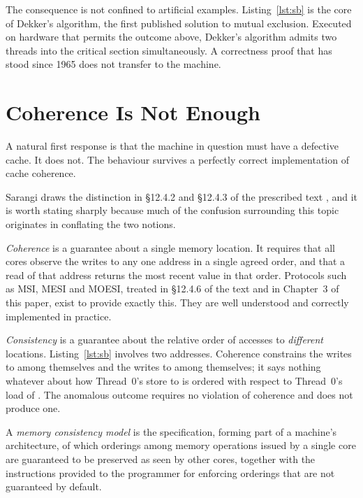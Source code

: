 The consequence is not confined to artificial examples.
Listing~\ref{lst:sb} is
the core of Dekker's algorithm, the first published solution to mutual exclusion.
Executed on hardware that permits the outcome above, Dekker's algorithm admits two
threads into the critical section simultaneously.
A correctness proof that has
stood since 1965 does not transfer to the machine.

\section{Coherence Is Not Enough}
\label{sec:coherence-not-enough}

A natural first response is that the machine in question must have a defective
cache.
It does not.
The behaviour survives a perfectly correct implementation of
cache coherence.

Sarangi draws the distinction in \S12.4.2 and \S12.4.3 of the prescribed text
\cite{sarangi2025basic}, and it is worth stating sharply because much of the
confusion surrounding this topic originates in conflating the two notions.

\emph{Coherence} is a guarantee about a single memory location. It requires that
all cores observe the writes to any one address in a single agreed order, and that
a read of that address returns the most recent value in that order.
Protocols such
as MSI, MESI and MOESI, treated in \S12.4.6 of the text and in Chapter~3 of this
paper, exist to provide exactly this.
They are well understood and correctly
implemented in practice.

\emph{Consistency} is a guarantee about the relative order of accesses to
\emph{different} locations. Listing~\ref{lst:sb} involves two addresses. Coherence
constrains the writes to  among themselves and the writes to 
among themselves; it says nothing whatever about how Thread~0's store to 
is ordered with respect to Thread~0's load of .
The anomalous outcome
requires no violation of coherence and does not produce one.

\begin{definition}
A \emph{memory consistency model} is the specification, forming part of a
machine's architecture, of which orderings among memory operations issued by a
single core are guaranteed to be preserved as seen by other cores, together with
the instructions provided to the programmer for enforcing orderings that are not
guaranteed by default.
\end{definition}

